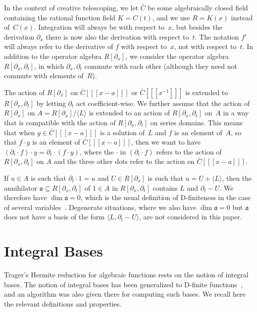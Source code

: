 \documentclass[final,1p,times,authoryear]{elsarticle}
\def\<#1>{\langle#1\rangle}
\begin{document}
In the context of creative telescoping, we let $\bar C$ be some algebraically
closed field containing the rational function field $K=C(t)$, and we
use $R=K(x)$ instead of~$C(x)$. Integration will always be with respect to~$x$, but
besides the derivation $\partial_x$ there is now also the derivation with respect
to~$t$. The notation $f'$ will always refer to the derivative of $f$
with respect to~$x$, not with respect to~$t$. In addition to the operator
algebra $R[\partial_x]$, we consider the
operator algebra $R[\partial_x,\partial_t]$, in which $\partial_x,\partial_t$
commute with each other (although they need not commute with elements of~$R$).

The action of $R[\partial_x]$ on $\bar C[[[x-a]]]$ or $\bar C[[[x^{-1}]]]$ is extended
to $R[\partial_x,\partial_t]$ by letting $\partial_t$ act coefficient-wise.
We further assume that the action of $R[\partial_x]$ on $A=R[\partial_x]/\<L>$ is
extended to an action of $R[\partial_x,\partial_t]$ on~$A$ in a way that is
compatible with the action of $R[\partial_x,\partial_t]$ on series domains.
This means that when $y\in\bar C[[[x-a]]]$ is a solution of~$L$ and $f$ is an
element of~$A$, so that $f\cdot y$ is an element of $\bar C[[[x-a]]]$, then we
want to have $(\partial_t\cdot f)\cdot y=\partial_t\cdot(f\cdot y)$, where
the $\cdot$ in $(\partial_t\cdot f)$ refers to the action of $R[\partial_x,\partial_t]$
on $A$ and the three other dots refer to the action on $\bar C[[[x-a]]]$.

If $u\in A$ is such that $\partial_t\cdot 1 = u$ and $U\in R[\partial_x]$ is such
that $u=U+\<L>$, then the annihilator $\mathfrak{a}\subseteq R[\partial_x,\partial_t]$
of $1\in A$ in $R[\partial_x,\partial_t]$ contains $L$ and $\partial_t-U$. We
therefore have $\dim\mathfrak{a}=0$, which is the usual
definition of D-finiteness in the case of several variables~\citep{Zeilberger1990,chyzak98,koutschan09,kauers14c}.
Degenerate situations, where we also have $\dim\mathfrak{a}=0$ but
$\mathfrak{a}$ does not have a basis of the form $\<L,\partial_t-U>$, are not
considered in this paper.

\section{Integral Bases}

Trager's Hermite reduction for algebraic functions rests on the notion of
integral bases. The notion of integral bases has been generalized to D-finite
functions~\citep{kauers15b}, and an algorithm was also given there for
computing such bases. We recall here the relevant definitions and properties.
\end{document}
